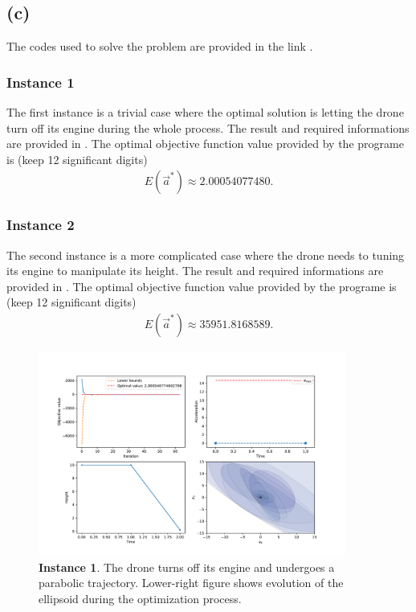 \documentclass[letterpaper,10pt]{article}
\begin{document}
\subsection{(c)}

The codes used to solve the problem are provided in the link \url{}.

\subsubsection*{Instance 1}

The first instance is a trivial case where the optimal solution is letting the drone turn off its engine during the whole process. The result and required informations are provided in .
The optimal objective function value provided by the programe is (keep 12 significant digits)
\begin{align}
    E(\vec a^*)\approx 2.00054077480.
\end{align}

\subsubsection*{Instance 2}

The second instance is a more complicated case where the drone needs to tuning its engine to manipulate its height. 
The result and required informations are provided in .
The optimal objective function value provided by the programe is (keep 12 significant digits)
\begin{align}
    E(\vec a^*)\approx 35951.8168589.
\end{align}

\begin{figure}
    \centering
    \includegraphics[width=0.9\textwidth]{fig/Figure_1.pdf}
    \caption{\textbf{Instance 1}. The drone turns off its engine and undergoes a parabolic trajectory. Lower-right figure shows evolution of the ellipsoid during the optimization process.}
    \label{fig:instance1}
\end{figure}
\end{document}
